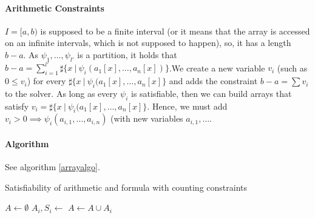 \documentclass[]{article}
\begin{document}
\paragraph{Arithmetic Constraints}\label{arithmetic-constraints}

$I = [a, b)$ is supposed to be a finite interval (or it means that the
array is accessed on an infinite intervals, which is not supposed to
happen), so, it has a length $b - a$. As $\psi_1, \ldots, \psi_{l'}$ is a
partition, it holds that
$b - a = \sum\limits_{i = 1}^{l'} \sharp\{x \ |\ \psi_i(a_1[x], \ldots, a_n[x])\}$.We
create a new variable $v_i$ (such as $0 \le v_i$) for every
$\sharp\{x\ |\ \psi_i(a_1[x], \ldots, a_n[x]\}$ and adds the constraint
$b - a = \sum v_i$ to the solver. As long as every $\psi_i$ is
satisfiable, then we can build arrays that satisfy
$v_i = \sharp\{x\ |\ \psi_i(a_1[x], \ldots, a_n[x]\}$. Hence, we must add
$v_i > 0 \implies \psi_i(a_{i, 1}, \ldots, a_{i, n})$ (with new variables
$a_{i, 1}, \ldots$.

\paragraph{Algorithm}\label{algorithm-1}

See algorithm \ref{arrayalgo}.

\begin{algorithm}[h]
\caption{Satisfiability of arithmetic and formula with counting constraints}\label{arith}
\begin{algorithmic}[1]
\State {}
    \State {}
    \State $A \gets \emptyset$
        \State $A_i, S_i \gets $ 
        \State $A \gets A \cup A_i$
            \State {}
            \State {}
        \EndIf
    \EndFor
    \State {}
    \State {}
    \State {}
    \State {}
    \State {}
    \State {}
        \State {}
        \State {}
    \EndIf
    \State {}
    \State {}
\EndWhile
\State {}
\end{algorithmic}
\label{arrayalgo}
\end{algorithm}
\end{document}
